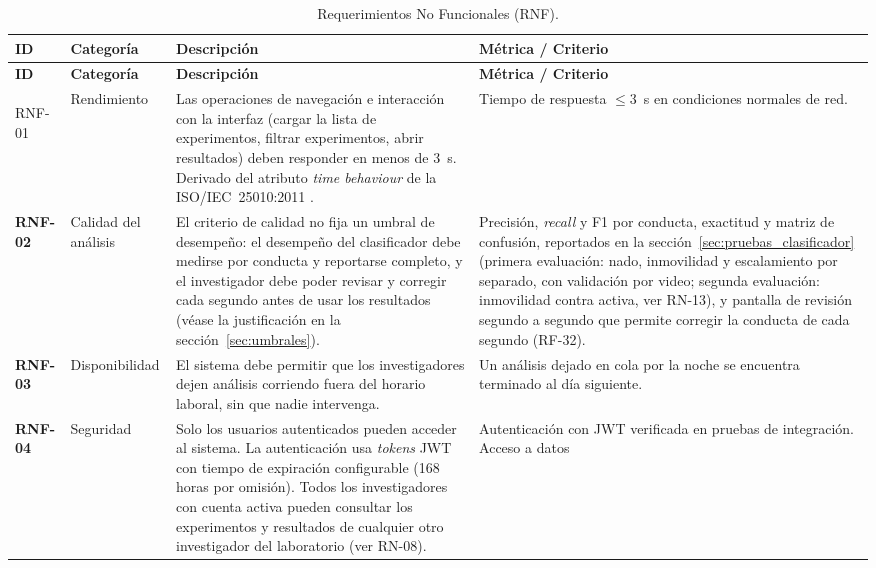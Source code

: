 \begin{longtable}{|>{\bfseries}p{1.2cm}|>{\raggedright}p{2.9cm}|>{\raggedright}p{5.2cm}|>{\raggedright\arraybackslash}p{3.8cm}|}
\caption{Requerimientos No Funcionales (RNF).
\label{tab:rnf}}\\
\hline
\textbf{ID} & \textbf{Categoría} & \textbf{Descripción} & \textbf{Métrica / Criterio} \\
\hline
\endfirsthead
\hline
\textbf{ID} & \textbf{Categoría} & \textbf{Descripción} & \textbf{Métrica / Criterio} \\
\hline
\endhead
\hline
\endfoot

RNF-01 & Rendimiento
       & Las operaciones de navegación e interacción con la interfaz (cargar la
         lista de experimentos, filtrar experimentos, abrir resultados) deben responder en menos
         de 3~s. Derivado del atributo \textit{time behaviour} de la ISO/IEC~25010:2011
         \cite{iso25010}.
       & Tiempo de respuesta $\leq 3$~s en condiciones normales de red. \\
\hline
RNF-02 & Calidad del análisis
       & El criterio de calidad no fija un umbral de desempeño: el desempeño del
         clasificador debe medirse por conducta y reportarse completo, y el investigador
         debe poder revisar y corregir cada segundo antes de usar los resultados (véase la
         justificación en la sección~\ref{sec:umbrales}).
       & Precisión, \textit{recall} y F1 por conducta, exactitud y matriz de confusión,
         reportados en la sección~\ref{sec:pruebas_clasificador} (primera evaluación: nado,
         inmovilidad y escalamiento por separado, con validación por video; segunda
         evaluación: inmovilidad contra activa, ver RN-13), y pantalla de revisión segundo
         a segundo que permite corregir la conducta de cada segundo (RF-32). \\
\hline
RNF-03 & Disponibilidad
       & El sistema debe permitir que los investigadores dejen análisis corriendo
         fuera del horario laboral, sin que nadie intervenga.
       & Un análisis dejado en cola por la noche se encuentra terminado al día
         siguiente. \\
\hline
RNF-04 & Seguridad
       & Solo los usuarios autenticados pueden acceder al sistema. La autenticación
         usa \textit{tokens} JWT con tiempo de expiración configurable (168 horas por omisión). Todos los
         investigadores con cuenta activa pueden consultar los experimentos y
         resultados de cualquier otro investigador del laboratorio (ver RN-08).
       & Autenticación con JWT verificada en pruebas de integración. Acceso a datos

\end{longtable}
